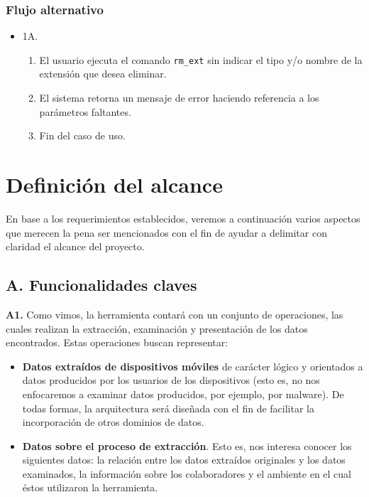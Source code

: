 \subsubsection*{Flujo alternativo}
\begin{itemize}
\item 1A.
    \begin{enumerate}
    \item El usuario ejecuta el comando \texttt{rm\_ext} sin indicar el tipo y/o nombre de la extensión que desea eliminar.
    \item El sistema retorna un mensaje de error haciendo referencia a los parámetros faltantes.
    \item Fin del caso de uso.
    \end{enumerate}
\end{itemize}

\section{Definición del alcance}
En base a los requerimientos establecidos, veremos a continuación varios aspectos que merecen la pena ser mencionados con el fin de ayudar a delimitar con claridad el alcance del proyecto.

\subsection*{A. Funcionalidades claves}
\textbf{A1.} Como vimos, la herramienta contará con un conjunto de operaciones, las cuales realizan la extracción, examinación y presentación de los datos encontrados. Estas operaciones buscan representar:

\begin{itemize}
\item \textbf{Datos extraídos de dispositivos móviles} de carácter lógico y orientados a datos producidos por los usuarios de los dispositivos (esto es, no nos enfocaremos a examinar datos producidos, por ejemplo, por malware). De todas formas, la arquitectura será diseñada con el fin de facilitar la incorporación de otros dominios de datos.
\item \textbf{Datos sobre el proceso de extracción}. Esto es, nos interesa conocer los siguientes datos: la relación entre los datos extraídos originales y los datos examinados, la información sobre los colaboradores y el ambiente en el cual éstos utilizaron la herramienta.
\end{itemize}

